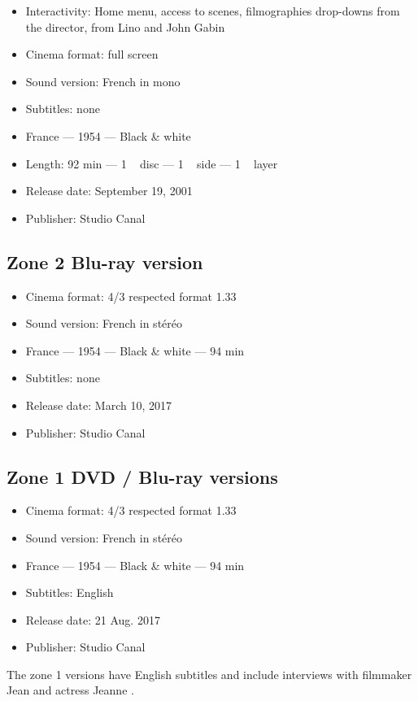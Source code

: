 \begin{itemize}%
    \item Interactivity: Home menu, access to scenes, filmographies drop-downs from the director, from Lino  and John \familyname Gabin{}
    \item Cinema format: full screen
    \item Sound version: French in mono
    \item Subtitles: none
    \item France --- 1954 --- Black \& white
    \item Length: 92 min --- 1 ~ disc --- 1 ~ side --- 1 ~ layer
    \item Release date: September 19, 2001
    \item Publisher: Studio Canal
\end{itemize}

\subsection*{Zone 2 Blu-ray version}

\begin{itemize}%
	\item Cinema format: 4/3 respected format 1.33
	\item Sound version: French in stéréo
	\item France --- 1954 --- Black \& white --- 94 min
	\item Subtitles: none
	\item Release date: March 10, 2017
	\item Publisher: Studio Canal
\end{itemize}

\subsection*{Zone 1 DVD / Blu-ray versions}

\begin{itemize}%
	\item Cinema format: 4/3 respected format 1.33
	\item Sound version: French in stéréo
	\item France --- 1954 --- Black \& white --- 94 min
	\item Subtitles: English
	\item Release date: 21 Aug. 2017
	\item Publisher: Studio Canal
\end{itemize}

The zone 1 versions have English subtitles and include interviews with filmmaker Jean  and actress Jeanne .

